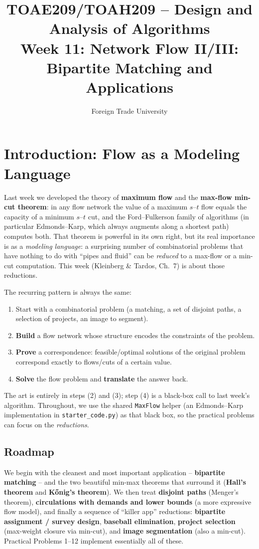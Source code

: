 \documentclass[11pt]{article}
\title{TOAE209/TOAH209 -- Design and Analysis of Algorithms\\[4pt]
\large Week 11: Network Flow II/III: Bipartite Matching and Applications}
\author{Foreign Trade University}
\date{}
\begin{document}
\maketitle
\tableofcontents

\section{Introduction: Flow as a Modeling Language}

Last week we developed the theory of \textbf{maximum flow} and the
\textbf{max-flow min-cut theorem}: in any flow network the value of a maximum
$s$--$t$ flow equals the capacity of a minimum $s$--$t$ cut, and the
Ford--Fulkerson family of algorithms (in particular Edmonds--Karp, which always
augments along a shortest path) computes both. That theorem is powerful in its
own right, but its real importance is as a \emph{modeling language}: a
surprising number of combinatorial problems that have nothing to do with
``pipes and fluid'' can be \emph{reduced} to a max-flow or a min-cut
computation. This week (Kleinberg \& Tardos, Ch.\ 7) is about those reductions.

The recurring pattern is always the same:
\begin{enumerate}[label=(\arabic*)]
    \item Start with a combinatorial problem (a matching, a set of disjoint
    paths, a selection of projects, an image to segment).
    \item \textbf{Build} a flow network whose structure encodes the constraints
    of the problem.
    \item \textbf{Prove} a correspondence: feasible/optimal solutions of the
    original problem correspond exactly to flows/cuts of a certain value.
    \item \textbf{Solve} the flow problem and \textbf{translate} the answer
    back.
\end{enumerate}

The art is entirely in steps (2) and (3); step (4) is a black-box call to last
week's algorithm. Throughout, we use the shared \texttt{MaxFlow} helper (an
Edmonds--Karp implementation in \texttt{starter\_code.py}) as that black box, so
the practical problems can focus on the \emph{reductions}.

\subsection{Roadmap}

We begin with the cleanest and most important application -- \textbf{bipartite
matching} -- and the two beautiful min-max theorems that surround it
(\textbf{Hall's theorem} and \textbf{K\H{o}nig's theorem}). We then treat
\textbf{disjoint paths} (Menger's theorem), \textbf{circulations with demands
and lower bounds} (a more expressive flow model), and finally a sequence of
``killer app'' reductions: \textbf{bipartite assignment / survey design},
\textbf{baseball elimination}, \textbf{project selection} (max-weight closure
via min-cut), and \textbf{image segmentation} (also a min-cut). Practical
Problems 1--12 implement essentially all of these.
\end{document}
